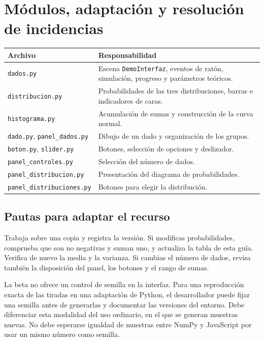 \documentclass[11pt,a4paper]{article}
\begin{document}
\clearpage\section{Módulos, adaptación y resolución de incidencias}
\begin{tabularx}{\textwidth}{@{}p{49mm}Y@{}}\toprule
\textbf{Archivo} & \textbf{Responsabilidad}\\\midrule
\texttt{dados.py} & Escena \texttt{DemoInterfaz}, eventos de ratón, simulación, progreso y parámetros teóricos.\\
\texttt{distribucion.py} & Probabilidades de las tres distribuciones, barras e indicadores de caras.\\
\texttt{histograma.py} & Acumulación de sumas y construcción de la curva normal.\\
\texttt{dado.py}, \texttt{panel\_dados.py} & Dibujo de un dado y organización de los grupos.\\
\texttt{boton.py}, \texttt{slider.py} & Botones, selección de opciones y deslizador.\\
\texttt{panel\_controles.py} & Selección del número de dados.\\
\texttt{panel\_distribucion.py} & Presentación del diagrama de probabilidades.\\
\texttt{panel\_distribuciones.py} & Botones para elegir la distribución.\\\bottomrule
\end{tabularx}

\subsection{Pautas para adaptar el recurso}
Trabaja sobre una copia y registra la versión. Si modificas probabilidades, comprueba que son no negativas y suman uno, y actualiza la tabla de esta guía. Verifica de nuevo la media y la varianza. Si cambias el número de dados, revisa también la disposición del panel, los botones y el rango de sumas.

La beta no ofrece un control de semilla en la interfaz. Para una reproducción exacta de las tiradas en una adaptación de Python, el desarrollador puede fijar una semilla antes de generarlas y documentar las versiones del entorno. Debe diferenciar esta modalidad del uso ordinario, en el que se generan muestras nuevas. No debe esperarse igualdad de muestras entre NumPy y JavaScript por usar un mismo número como semilla.
\end{document}
